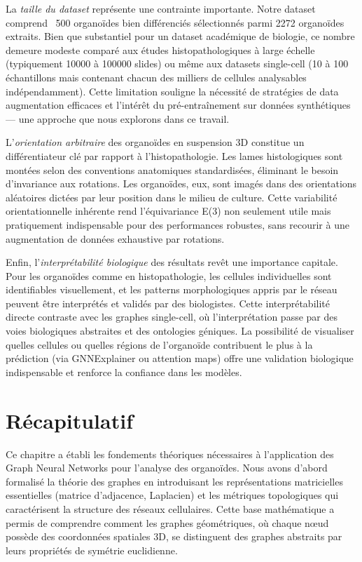 La \textit{taille du dataset} représente une contrainte importante. Notre dataset comprend ~500 organoïdes bien différenciés sélectionnés parmi 2272 organoïdes extraits. Bien que substantiel pour un dataset académique de biologie, ce nombre demeure modeste comparé aux études histopathologiques à large échelle (typiquement 10000 à 100000 slides) ou même aux datasets single-cell (10 à 100 échantillons mais contenant chacun des milliers de cellules analysables indépendamment). Cette limitation souligne la nécessité de stratégies de data augmentation efficaces et l'intérêt du pré-entraînement sur données synthétiques — une approche que nous explorons dans ce travail.

L'\textit{orientation arbitraire} des organoïdes en suspension 3D constitue un différentiateur clé par rapport à l'histopathologie. Les lames histologiques sont montées selon des conventions anatomiques standardisées, éliminant le besoin d'invariance aux rotations. Les organoïdes, eux, sont imagés dans des orientations aléatoires dictées par leur position dans le milieu de culture. Cette variabilité orientationnelle inhérente rend l'équivariance E(3) non seulement utile mais pratiquement indispensable pour des performances robustes, sans recourir à une augmentation de données exhaustive par rotations.

Enfin, l'\textit{interprétabilité biologique} des résultats revêt une importance capitale. Pour les organoïdes comme en histopathologie, les cellules individuelles sont identifiables visuellement, et les patterns morphologiques appris par le réseau peuvent être interprétés et validés par des biologistes. Cette interprétabilité directe contraste avec les graphes single-cell, où l'interprétation passe par des voies biologiques abstraites et des ontologies géniques. La possibilité de visualiser quelles cellules ou quelles régions de l'organoïde contribuent le plus à la prédiction (via GNNExplainer ou attention maps) offre une validation biologique indispensable et renforce la confiance dans les modèles.

\section{Récapitulatif}

Ce chapitre a établi les fondements théoriques nécessaires à l'application des Graph Neural Networks pour l'analyse des organoïdes. Nous avons d'abord formalisé la théorie des graphes en introduisant les représentations matricielles essentielles (matrice d'adjacence, Laplacien) et les métriques topologiques qui caractérisent la structure des réseaux cellulaires. Cette base mathématique a permis de comprendre comment les graphes géométriques, où chaque nœud possède des coordonnées spatiales 3D, se distinguent des graphes abstraits par leurs propriétés de symétrie euclidienne.

